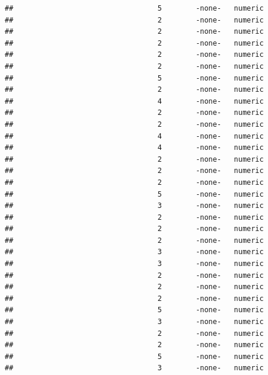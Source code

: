 \documentclass[
  12pt,
]{article}
\begin{document}
\begin{verbatim}
##                                  5        -none-   numeric                    
##                                  2        -none-   numeric                    
##                                  2        -none-   numeric                    
##                                  2        -none-   numeric                    
##                                  2        -none-   numeric                    
##                                  2        -none-   numeric                    
##                                  5        -none-   numeric                    
##                                  2        -none-   numeric                    
##                                  4        -none-   numeric                    
##                                  2        -none-   numeric                    
##                                  2        -none-   numeric                    
##                                  4        -none-   numeric                    
##                                  4        -none-   numeric                    
##                                  2        -none-   numeric                    
##                                  2        -none-   numeric                    
##                                  2        -none-   numeric                    
##                                  5        -none-   numeric                    
##                                  3        -none-   numeric                    
##                                  2        -none-   numeric                    
##                                  2        -none-   numeric                    
##                                  2        -none-   numeric                    
##                                  3        -none-   numeric                    
##                                  3        -none-   numeric                    
##                                  2        -none-   numeric                    
##                                  2        -none-   numeric                    
##                                  2        -none-   numeric                    
##                                  5        -none-   numeric                    
##                                  3        -none-   numeric                    
##                                  2        -none-   numeric                    
##                                  2        -none-   numeric                    
##                                  5        -none-   numeric                    
##                                  3        -none-   numeric                    

\end{verbatim}
\end{document}
